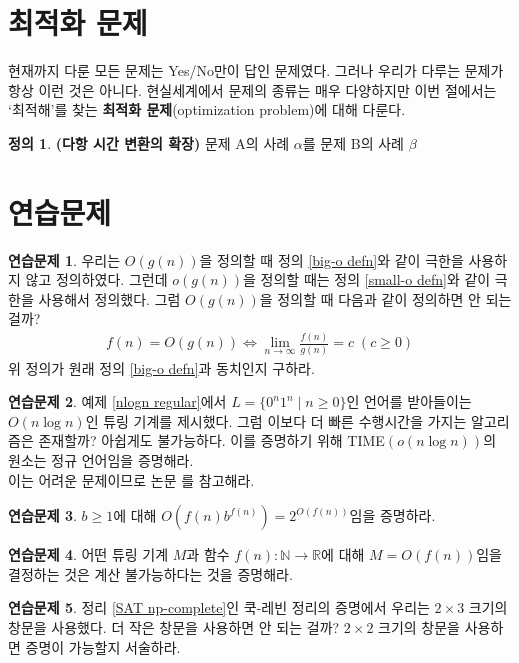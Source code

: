 \documentclass[b5paper, 11pt]{book}
\theoremstyle{definition}
\newtheorem{defn}{정의}[chapter]
\newtheorem{ec}{연습문제}[chapter]
\begin{document}
\section{최적화 문제}
현재까지 다룬 모든 문제는 Yes/No만이 답인 문제였다. 그러나 우리가 다루는 문제가 항상 이런 것은 아니다. 현실세계에서 문제의 종류는 매우 다양하지만 이번 절에서는 `최적해'를 찾는 \textbf{최적화 문제}(optimization problem)에 대해 다룬다.
\begin{defn}
    \textbf{(다항 시간 변환의 확장)} 문제 A의 사례 $\alpha$를 문제 B의 사례 $\beta$
\end{defn} 
\section{연습문제}
\begin{ec}\label{On lim}
    우리는 $O(g(n))$을 정의할 때 정의 \ref{big-o defn}와 같이 극한을 사용하지 않고 정의하였다. 그런데 $o(g(n))$을 정의할 때는 정의 \ref{small-o defn}와 같이 극한을 사용해서 정의했다. 그럼 $O(g(n))$을 정의할 때 다음과 같이 정의하면 안 되는 걸까?
    \begin{align*}
        f(n) = O(g(n)) \Leftrightarrow \lim_{n \rightarrow \infty} \frac{f(n)}{g(n)} = c \; (c \ge 0)
    \end{align*}
    위 정의가 원래 정의 \ref*{big-o defn}과 동치인지 구하라.
\end{ec}
\begin{ec}
    예제 \ref{nlogn regular}에서 $L = \{0^n 1^n \;\vert\; n \ge 0\}$인 언어를 받아들이는 $O(n\log{n})$인 튜링 기계를 제시했다. 그럼 이보다 더 빠른 수행시간을 가지는 알고리즘은 존재할까? 아쉽게도 불가능하다. 이를 증명하기 위해 TIME$(o(n\log{n}))$의 원소는 정규 언어임을 증명해라.\\
    이는 어려운 문제이므로 논문 \cite{kobayashi1985structure}를 참고해라.
\end{ec}
\begin{ec}\label{2^O(f(n))}
    $b \ge 1$에 대해 $O(f(n) b^{f(n)}) = 2^{O(f(n))}$임을 증명하라.
\end{ec}
\begin{ec}
    어떤 튜링 기계 $M$과 함수 $f(n):\mathbb{N} \rightarrow \mathbb{R}$에 대해 $M = O(f(n))$임을 결정하는 것은 계산 불가능하다는 것을 증명해라.
\end{ec}
\begin{ec}
    정리 \ref{SAT np-complete}인 쿡-레빈 정리의 증명에서 우리는 $2\times 3$ 크기의 창문을 사용했다. 더 작은 창문을 사용하면 안 되는 걸까? $2\times 2$ 크기의 창문을 사용하면 증명이 가능할지 서술하라.
\end{ec}
\end{document}
